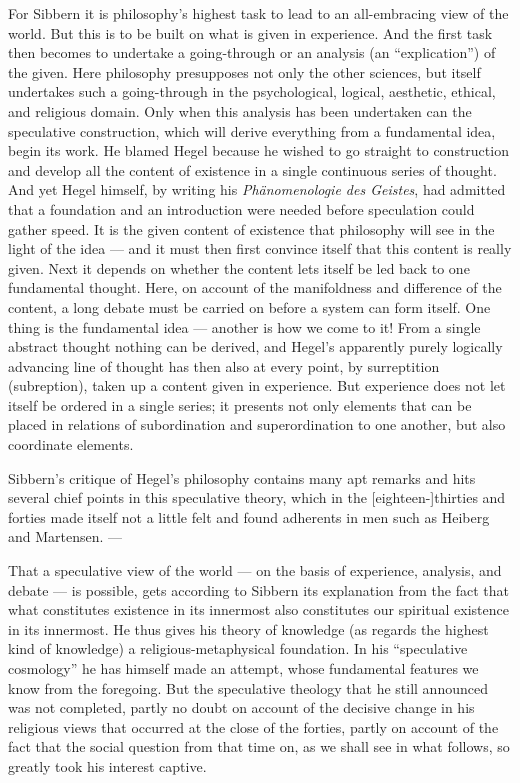 \documentclass[12pt,a4paper]{book}
\newcommand{\opage}[1]{\marginnote{\footnotesize\textit{[#1]}}}
\begin{document}
\opage{110}For Sibbern it is philosophy's highest task to lead to an all-embracing view of the world. But
this is to be built on what is given in experience. And the first task then becomes to undertake
a going-through or an analysis (an ``explication'') of the given. Here philosophy presupposes not
only the other sciences, but itself undertakes such a going-through in the psychological,
logical, aesthetic, ethical, and religious domain. Only when this analysis has been undertaken
can the speculative construction, which will derive everything from a fundamental idea, begin its
work. He blamed Hegel because he wished to go straight to construction and develop all the
content of existence in a single continuous series of thought. And yet Hegel himself, by writing
his \emph{Phänomenologie des Geistes}, had admitted that a foundation and an introduction were
needed before speculation could gather speed. It is the given content of existence that
philosophy will see in the light of the idea --- and it must then first convince itself that this
content is really given. Next it depends on whether the content lets itself be led back to one
fundamental thought. Here, on account of the manifoldness and difference of the content, a long
debate must be carried on before a system can form itself. One thing is the fundamental idea ---
another is how we come to it! From a single abstract thought nothing can be derived, and Hegel's
apparently purely logically advancing line of thought has then also at every point, by
surreptition (subreption), taken up a content given in experience. But experience does not let
itself be ordered in a single series; it presents not only elements that can be placed in
relations of subordination and superordination to one another, but also coordinate elements.

Sibbern's critique of Hegel's philosophy contains many apt remarks and hits several chief points
in this speculative theory, which in the [eighteen-]thirties and forties made itself not a little
felt and found adherents in men such as Heiberg and Martensen. ---

That a speculative view of the world --- on the basis of experience, analysis, and debate --- is
possible, gets according to Sibbern its explanation from the fact that what constitutes existence
in \opage{111}its innermost also constitutes our spiritual existence in its innermost. He thus gives his
theory of knowledge (as regards the highest kind of knowledge) a religious-metaphysical
foundation. In his ``speculative cosmology'' he has himself made an attempt, whose fundamental
features we know from the foregoing. But the speculative theology that he still announced was not
completed, partly no doubt on account of the decisive change in his religious views that occurred
at the close of the forties, partly on account of the fact that the social question from that
time on, as we shall see in what follows, so greatly took his interest captive.
\end{document}
